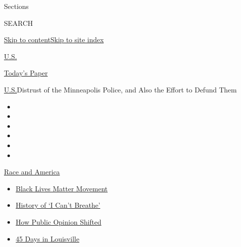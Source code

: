 Sections

SEARCH

\protect\hyperlink{site-content}{Skip to
content}\protect\hyperlink{site-index}{Skip to site index}

\href{https://www.nytimes3xbfgragh.onion/section/us}{U.S.}

\href{https://myaccount.nytimes3xbfgragh.onion/auth/login?response_type=cookie\&client_id=vi}{}

\href{https://www.nytimes3xbfgragh.onion/section/todayspaper}{Today's
Paper}

\href{/section/us}{U.S.}\textbar{}Distrust of the Minneapolis Police,
and Also the Effort to Defund Them

\begin{itemize}
\item
\item
\item
\item
\item
\item
\end{itemize}

\href{https://www.nytimes3xbfgragh.onion/news-event/george-floyd-protests-minneapolis-new-york-los-angeles?action=click\&pgtype=Article\&state=default\&region=TOP_BANNER\&context=storylines_menu}{Race
and America}

\begin{itemize}
\tightlist
\item
  \href{https://www.nytimes3xbfgragh.onion/interactive/2020/07/03/us/george-floyd-protests-crowd-size.html?action=click\&pgtype=Article\&state=default\&region=TOP_BANNER\&context=storylines_menu}{Black
  Lives Matter Movement}
\item
  \href{https://www.nytimes3xbfgragh.onion/interactive/2020/06/28/us/i-cant-breathe-police-arrest.html?action=click\&pgtype=Article\&state=default\&region=TOP_BANNER\&context=storylines_menu}{History
  of `I Can't Breathe'}
\item
  \href{https://www.nytimes3xbfgragh.onion/interactive/2020/06/10/upshot/black-lives-matter-attitudes.html?action=click\&pgtype=Article\&state=default\&region=TOP_BANNER\&context=storylines_menu}{How
  Public Opinion Shifted}
\item
  \href{https://www.nytimes3xbfgragh.onion/interactive/2020/07/16/us/black-lives-matter-protests-louisville-breonna-taylor.html?action=click\&pgtype=Article\&state=default\&region=TOP_BANNER\&context=storylines_menu}{45
  Days in Louisville}
\end{itemize}

